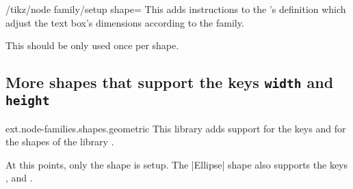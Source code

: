 \begin{key}{/tikz/node family/setup shape=}
This adds instructions to the 's definition which
adjust the text box's dimensions according to the family.

This should be only used once per shape.
\end{key}
\begin{codeexample}[width=9cm,preamble=\usetikzlibrary{ext.node-families,shapes.geometric}]
\tikzexternaldisable %
\end{codeexample}

\subsection{More shapes that support the keys \texttt{width} and \texttt{height}}
\begin{tikzlibrary}{ext.node-families.shapes.geometric}
  This library adds support for the keys  and
   for the shapes of
  the \pgfname\space library .

\end{tikzlibrary}
At this points, only the shape  is setup.
The |Ellipse| shape also supports the keys
,
 and
.
\endinput